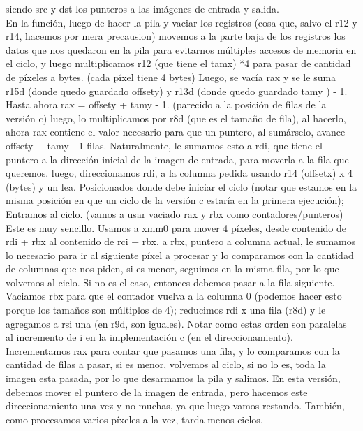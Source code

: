 \documentclass[a4paper]{article}
\begin{document}
     siendo src y dst los punteros a las imágenes de entrada y salida.
    \hfill \break
    \\
     En la función, luego de hacer la pila y vaciar los registros (cosa que, salvo el r12 y r14, hacemos por mera precausion) movemos a la parte baja de los registros los datos que nos quedaron en la pila para evitarnos múltiples accesos de memoria en el ciclo, y luego multiplicamos r12 (que tiene el tamx) *4 para pasar de cantidad de píxeles a bytes. (cada píxel tiene 4 bytes)
     \hfill \break
     Luego, se vacía rax y se le suma r15d (donde quedo guardado offsety) y r13d (donde quedo guardado tamy ) - 1.
     Hasta ahora rax = offsety + tamy - 1. (parecido a la posición de filas de la versión c) luego, lo multiplicamos por r8d (que es el tamaño de fila), al hacerlo, ahora rax contiene el valor necesario para que un puntero, al sumárselo, avance offsety + tamy - 1 filas. Naturalmente, le sumamos esto a rdi, que tiene el puntero a la dirección inicial de la imagen de entrada, para moverla a la fila que queremos. luego, direccionamos rdi, a la columna pedida usando r14 (offsetx) x 4 (bytes) y un lea. Posicionados donde debe iniciar el ciclo (notar que estamos en la misma posición en que un ciclo de la versión c estaría  en la primera ejecución);
     \hfill \break
      Entramos al ciclo. (vamos a usar vaciado rax y rbx como contadores/punteros)
       Este es muy sencillo. Usamos a xmm0 para mover 4 píxeles, desde contenido de rdi + rbx al contenido de rci + rbx.
      a rbx,  puntero a columna actual, le sumamos lo necesario para ir al siguiente píxel a procesar y lo comparamos con la cantidad de columnas que nos piden, si es menor, seguimos en la misma fila, por lo que volvemos al ciclo.       
      Si no es el caso, entonces debemos pasar a la fila siguiente. Vaciamos rbx para que el contador vuelva a la columna 0 (podemos hacer esto porque los tamaños son múltiplos de 4); reducimos rdi x una fila (r8d) y le agregamos a rsi una (en r9d, son iguales). Notar como estas orden son paralelas al incremento de i  en la implementación c (en el direccionamiento).
      \hfill \break      
      Incrementamos rax para contar que pasamos una fila, y lo comparamos con la cantidad de filas a pasar, si es menor, volvemos al ciclo, si no lo es, toda la imagen esta pasada, por lo que desarmamos la pila y salimos.
      \hfill \break
      En esta versión, debemos mover el puntero de la imagen de entrada, pero hacemos este direccionamiento una vez y no muchas, ya que luego vamos restando. También, como procesamos varios píxeles a la vez, tarda menos ciclos.
             
\end{document}
